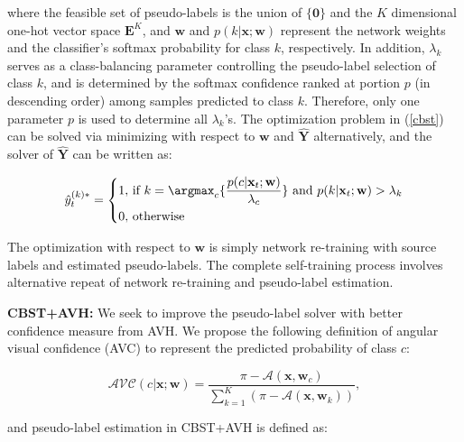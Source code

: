where the feasible set of pseudo-labels is the union of $\{\mathbf{0}\}$ and the $K$ dimensional one-hot vector space $\mathbf{E}^K$, and $\mathbf{w}$ and $p(k|\mathbf{x};\mathbf{w})$ represent the network weights and the classifier's softmax probability for class $k$, respectively. In addition, $\lambda_{k}$ serves as a class-balancing parameter controlling the pseudo-label selection of class $k$, and is determined by the softmax confidence ranked at portion $p$ (in descending order) among samples predicted to class $k$. Therefore, only one parameter $p$ is used to determine all $\lambda_k$'s. The optimization problem in (\ref{cbst}) can be solved via minimizing with respect to $\mathbf{w}$ and $\hat{\mathbf{Y}}$ alternatively, and the solver of $\hat{\mathbf{Y}}$ can be written as:

\begin{small}
\begin{equation}\label{cbst_solver}
\hat{y}_{t}^{(k)*}=\left\{
\begin{aligned}
1, &~\text{if}~k=\argmax_{c}\{\frac {p(c|{\mathbf{x}_{t}};\mathbf{w})}{\lambda_c}\}~ \text{and}~ p(k|\mathbf{x}_t;\mathbf{w})>\lambda_k\\
0, &~\mathrm{otherwise}
\end{aligned}
\right.
\nonumber
\end{equation}
\end{small}

The optimization with respect to $\mathbf{w}$ is simply network re-training with source labels and estimated pseudo-labels. The complete self-training process involves alternative repeat of network re-training and pseudo-label estimation.

\textbf{CBST+AVH:} We seek to improve the pseudo-label solver with better confidence measure from AVH. We propose the following definition of angular visual confidence (AVC) to represent the predicted probability of class $c$:

\begin{small}

\begin{equation}\label{avh_prob2}
\mathcal{AVC}(c|\mathbf{x}; \mathbf{w}) = \frac{\pi - \mathcal{A}(\mathbf{x},\mathbf{w}_c)}{\sum_{k=1}^{K} (\pi - \mathcal{A}(\mathbf{x}, \mathbf{w}_k))},
\end{equation}

\end{small}

and pseudo-label estimation in CBST+AVH is defined as:

